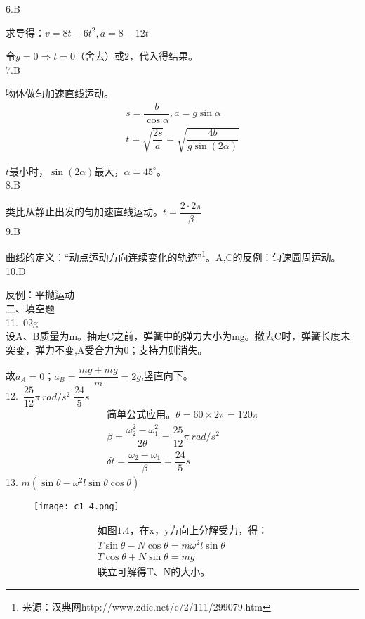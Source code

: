 \documentclass[a4paper,fleqn,twocolumn]{ctexart}
\begin{document}
		6.B\par
		求导得：$v=8t-6t^2,a=8-12t$\par
		$\text{令}y=0\Rightarrow t=0\text{（舍去）或}2$，代入得结果。\\
		7.B\par
		物体做匀加速直线运动。\vspace{-1em}
		\begin{gather*}
		s=\dfrac{b}{\cos\alpha},a=g\sin\alpha\\
		t=\sqrt{\dfrac{2s}{a}}=\sqrt{\dfrac{4b}{g\sin(2\alpha)}}
		\end{gather*}
		\par $t$最小时，$\sin(2\alpha)$最大，$\alpha=45^\circ$。\\
		8.B\par 
		类比从静止出发的匀加速直线运动。$t=\dfrac{2\cdot 2\pi}{\beta}$\\
		9.B\par 
		曲线的定义：“动点运动方向连续变化的轨迹”\footnote{来源：汉典网http://www.zdic.net/c/2/111/299079.htm}。A,C的反例：匀速圆周运动。\\
		10.D\par 
		反例：平抛运动\\		
		二、填空题\\
		11.\ 0\qquad2g\\
		\indent
		设A、B质量为m。抽走C之前，弹簧中的弹力大小为mg。撤去C时，弹簧长度未突变，弹力不变,A受合力为0；支持力则消失。\par
		故$a_A=0；a_B=\dfrac{mg+mg}{m}=2g$,竖直向下。\\
		12.\ $\dfrac{25}{12}\pi\ rad/s^2$ \qquad$\dfrac{24}{5}s$
		\begin{gather*}
		\text{简单公式应用。}\theta=60\times2\pi=120\pi\\
		\beta=\dfrac{\omega_2^2-\omega_1^2}{2\theta}=\dfrac{25}{12}\pi\ rad/s^2\\
		\delta t=\dfrac{\omega_2-\omega_1}{\beta}=\dfrac{24}{5}s
		\end{gather*}
		13. $m(\sin\theta-\omega^2l\sin\theta\cos\theta)$
		\vspace{-1em}
		\begin{figure}[htbp]
			\centering
			\texttt{[image: c1\_4.png]}
			\label{fig:c1}
		\end{figure}
		\vspace{-3em}
		\begin{gather*}
			\text{如图1.4，在x，y方向上分解受力，得：}\\		
			T\sin\theta-N\cos\theta=m\omega^2l\sin\theta\\
			T\cos\theta+N\sin\theta=mg\\
			\text{联立可解得T、N的大小。}
		\end{gather*}
\end{document}
